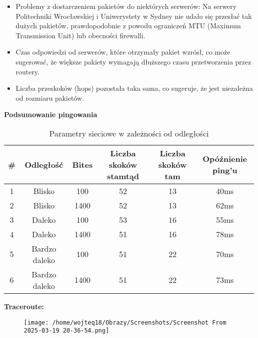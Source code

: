 \documentclass[12pt]{article}
\begin{document}
\vspace{1\baselineskip}
\begin{itemize}
  \item Problemy z dostarczeniem pakietów do niektórych serwerów: Na serwery Politechniki Wrocławskiej i Uniwerystety w Sydney nie udało
  się przesłać tak dużych pakietów, prawdopodobnie z powodu ograniczeń MTU (Maximum Transmission Unit) lub obecności firewalli.
  \item Czas odpowiedzi od serwerów, które otrzymały pakiet wzrósł, co może sugerować, że większe pakiety wymagają dłuższego czasu
  przetworzenia przez routery.
  \item Liczba przeskoków (hops) pozostała taka sama, co sugeruje, że jest niezależna od rozmiaru pakietów.
\end{itemize}
\vspace{1\baselineskip}
\textbf{Podsumowanie pingowania} \newline
\begin{table}[h]
  \centering
  \begin{tabular}{cccccc} %
      \toprule
      \textbf{\#} & \textbf{Odległość} & \textbf{Bites} & \textbf{Liczba skoków stamtąd} & \textbf{Liczba skoków tam} & \textbf{Opóźnienie ping'u} \\ 
      \midrule
      1  & Blisko         & 100  & 52 & 13 & 40ms   \\ 
      2  & Blisko         & 1400 & 52 & 13 & 62ms \\ 
      3  & Daleko         & 100  & 53 & 16 & 55ms  \\ 
      4  & Daleko         & 1400 & 51 & 16 & 78ms  \\ 
      5  & Bardzo daleko  & 100  & 51 & 22 & 70ms    \\ 
      6  & Bardzo daleko  & 1400 & 51 & 22 & 73ms    \\ 
      \bottomrule
  \end{tabular}
  \caption{Parametry sieciowe w zależności od odległości}
  \label{tab:network_parameters}
\end{table}

\vspace{1\baselineskip}
\textbf{Traceroute:}

\begin{figure}[H]
  \centering
  \texttt{[image: /home/wojteq18/Obrazy/Screenshots/Screenshot From 2025-03-19 20-36-54.png]}
  \label{fig:traceroute_china}
\end{figure}
\end{document}

